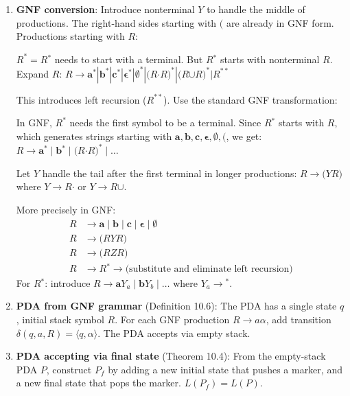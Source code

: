 \begin{enumerate}[{10.}1. ]
\begin{enumerate}
\item \textbf{GNF conversion}: Introduce nonterminal $Y$ to handle the middle of productions. The right-hand sides starting with $\pmb{(}$ are already in GNF form. Productions starting with $R$:

$R^{\pmb{*}} = R\pmb{^*}$ needs to start with a terminal. But $R\pmb{^*}$ starts with nonterminal $R$. Expand $R$:
$R \to \pmb{a}^{\pmb{*}}|\pmb{b}^{\pmb{*}}|\pmb{c}^{\pmb{*}}|\pmb{\epsilon}^{\pmb{*}}|\pmb{\emptyset}^{\pmb{*}}|\pmb{(}R\pmb{\cdot}R\pmb{)}^{\pmb{*}}|\pmb{(}R\pmb{\cup}R\pmb{)}^{\pmb{*}}|R^{\pmb{**}}$

This introduces left recursion ($R^{\pmb{**}}$). Use the standard GNF transformation:

In GNF, $R^{\pmb{*}}$ needs the first symbol to be a terminal. Since $R\pmb{^*}$ starts with $R$, which generates strings starting with $\pmb{a},\pmb{b},\pmb{c},\pmb{\epsilon},\pmb{\emptyset},\pmb{(}$, we get:
$R \to \pmb{a}\pmb{^*} \mid \pmb{b}\pmb{^*} \mid \pmb{(}R\pmb{\cdot}R\pmb{)}^{\pmb{*}} \mid \ldots$

Let $Y$ handle the tail after the first terminal in longer productions:
$R \to \pmb{(}YR\pmb{)}$ where $Y \to R\pmb{\cdot}$ or $Y \to R\pmb{\cup}$.

More precisely in GNF:
\begin{align*}
R &\to \pmb{a} \mid \pmb{b} \mid \pmb{c} \mid \pmb{\epsilon} \mid \pmb{\emptyset} \\
R &\to \pmb{(}RYR\pmb{)} \\
R &\to \pmb{(}RZR\pmb{)} \\
R &\to R\pmb{^*} \to \text{(substitute and eliminate left recursion)}
\end{align*}
For $R\pmb{^*}$: introduce $R \to \pmb{a}Y_a \mid \pmb{b}Y_b \mid \ldots$ where $Y_a \to \pmb{^*}$.

\item \textbf{PDA from GNF grammar} (Definition 10.6): The PDA has a single state $q$, initial stack symbol $R$. For each GNF production $R \to a\alpha$, add transition $\delta(q,a,R) = \langle q,\alpha\rangle$. The PDA accepts via empty stack.

\item \textbf{PDA accepting via final state} (Theorem 10.4): From the empty-stack PDA $P$, construct $P_f$ by adding a new initial state that pushes a marker, and a new final state that pops the marker. $L(P_f) = L(P)$.
\end{enumerate}


\end{enumerate}
